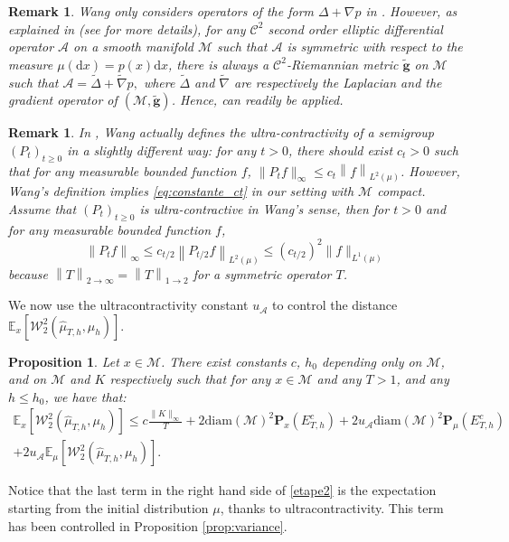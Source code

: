 \documentclass[10pt,a4paper]{article}
\newcommand{\E}{{\mathbb E}}
\renewcommand{\P}{{\mathbf P}}
\newcommand\cA{\mathcal{A}}
\newcommand\cM{\mathcal{M}}
\newcommand\cW{\mathcal{W}}
\newcommand\dd{\mathrm{d}}
\newcommand{\NRM}[1]{{{\left\| #1\right\|}}} %
\newcommand{\PAR}[1]{{{\left(#1\right)}}} %
\newcommand{\SBRA}[1]{{{\left[#1\right]}}} %
\newtheorem{remark}[theorem]{Remark}
\newtheorem{proposition}[theorem]{Proposition}
\begin{document}
\begin{remark} Wang  only considers operators of the form $\Delta+\nabla p$ in \cite{Wang2014}. However, as explained in  (see  for more details), for any $\mathcal{C}^2$ second order elliptic differential operator $\mathcal{A}$ on a smooth manifold $\mathcal{M}$ such that $\mathcal{A}$ is symmetric with respect to the measure $\mu(\dd x)=p(x) \dd x$, there is always a $\mathcal{C}^2$-Riemannian metric $\tilde{\mathbf{g}}$ on $\mathcal{M}$ such that $\mathcal{A}=\tilde{\Delta}+ \tilde{\nabla}p,$ where $\tilde{\Delta}$ and  $\tilde{\nabla}$ are respectively the Laplacian and the gradient operator of $(\cM, \tilde{\mathbf{g}})$. Hence, \cite[Theorem 3.5.5.]{Wang2014} can readily be applied.
\end{remark}



\begin{remark}
    In \cite{Wang2014}, Wang actually defines the ultra-contractivity of a semigroup $(P_t)_{t\ge 0}$  in a slightly different way: for any $t>0$, there should exist $c_t>0$ such that for any measurable bounded function $f$, $ \|  P_tf \|_{\infty} \le c_t\NRM{f}_{L^2(\mu)}$. However,  Wang's definition  implies \eqref{eq:constante_ct} in our setting with $\cM$ compact. Assume that $(P_t)_{t\ge 0}$ is ultra-contractive in Wang's sense, then for $t>0$ and for any measurable bounded function $f$,
    \[
        \NRM{P_tf}_{\infty}\le c_{t/2}\NRM{P_{t/2}f}_{L^2(\mu)}
\le \PAR{c_{t/2}}^2\|f\|_{L^1(\mu)}
    \]
     because $\NRM{T}_{2\to \infty}=\NRM{T}_{1\to 2}$ for a symmetric operator $T$. 
\end{remark}


We now use the ultracontractivity constant $u_\cA$ to control the distance $\mathbb{E}_{x} \left[ \cW_2^2( \widehat{\mu}_{T,h},\mu_h) \right]$.
\begin{proposition}\label{prop:ultracontractivite}
	Let $x\in\cM$. There exist constants $c$, $h_0$ depending only on $\cM$, and on $\cM$ and $K$ respectively such that for any $x\in \cM$ and any $T>1$, and any $h\le h_0$, we have that:
	\begin{multline}\label{etape2}
	    \mathbb{E}_{x} \left[ \cW_2^2( \widehat{\mu}_{T,h},\mu_h) \right] \le c  \frac{ \| K\|_{\infty}}{T} + 2\mathrm{diam}(\cM)^2\P_{x}( E^c_{T,h})+ 2u_\cA\mathrm{diam}(\cM)^2\P_\mu(E^c_{T,h}) \\ + 2u_\cA \E_\mu\SBRA{\cW_2^2( \widehat{\mu}_{T,h} ,\mu_h)}.
     \end{multline}
\end{proposition}
{Notice that the last term in the right hand side of \eqref{etape2} is the expectation starting from the initial distribution $\mu$, thanks to ultracontractivity. This term has been controlled in Proposition \ref{prop:variance}.}
\end{document}
